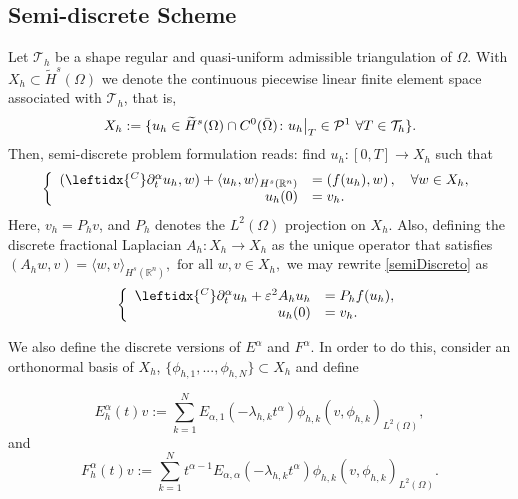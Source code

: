 \documentclass{amsart}
\newcommand{\rn}{{\mathbb{R}^n}}
\newcommand{\ele}{L^2(\Omega)}
\newcommand{\ppa}{\leftidx{^C}\partial_t^\alpha}
\newcommand{\W}{\Omega}
\newcommand{\eps}{\varepsilon}
\newcommand\restr[2]{{
  \left.\kern-\nulldelimiterspace 
#1 
  \vphantom{\big|} 
  \right|_{#2} 
  }}
\theoremstyle{remark}
\theoremstyle{definition}
\numberwithin{equation}{section}
\begin{document}
\subsection{Semi-discrete Scheme}
Let $\mathcal{T}_{h}$ be a shape regular and quasi-uniform admissible triangulation of $\Omega$. With $X_{h} \subset \widetilde{H}^s(\Omega)$ we denote the continuous piecewise linear finite element space associated with $\mathcal{T}_h$, that is,
$$X_{h} := \{u_h \in \widetilde{H}^s(\Omega)\cap C^0(\bar \Omega) \colon \restr{u_h}{T} \in \mathcal{P}^1 \ \forall T \in \mathcal{T}_{h}  \} .$$
Then, semi-discrete problem formulation reads:  find $u_h \colon [0, T] \to X_h$ such that 
\begin{equation} 
\label{semiDiscreto}
\left\lbrace
  \begin{array}{rl}
      ( \ppa u_h  , w )  +  \langle u_h, w \rangle_{H^s(\rn)} & =  \left( f(u_h), w \right), \quad \forall w \in X_h, \\
      u_h(0) & = v_h .
      \end{array}
\right.
\end{equation}
Here, $v_h = P_h v$, and $P_h$ denotes the $L^2(\W)$ projection on $X_h$. 
Also, defining the discrete fractional Laplacian $A_{h}: X_h \rightarrow X_{h}$ as the unique operator that satisfies $ ( A_{h} w , v ) = \langle w , v \rangle_{H^s(\rn)}, \text{  for all } w,v \in X_h, $
we may rewrite \eqref{semiDiscreto} as
\begin{equation} 
\left\lbrace
  \begin{array}{rl}
      \ppa u_h   +  \eps^2A_h u_h & =  P_hf(u_h), \\
      u_h(0) & = v_h.
      \end{array}
\label{eq:semiDiscreto2}
\right.
\end{equation}  

We also define the discrete versions of $E^{\alpha}$ and $F^{\alpha}$. In order to do this, consider an orthonormal basis of $X_h$,  $\{\phi_{h,1},...,\phi_{h,N}\} \subset X_h$ and define

\begin{equation}
\label{eq:operador_1_discreto}
E_h^{\alpha}(t)v := \sum^{N}_{k=1} E_{\alpha,1}(-\lambda_{h,k} t^{\alpha}) \phi_{h,k} (v,\phi_{h,k})_{\ele},
\end{equation}
and
\begin{equation}
\label{eq:operador_2_discreto}
F_h^{\alpha}(t)v := \sum^N_{k=1} t^{\alpha-1}E_{\alpha,\alpha}(-\lambda_{h,k} t^{\alpha}) \phi_{h,k} (v,\phi_{h,k})_{\ele}.
\end{equation}
\end{document}
